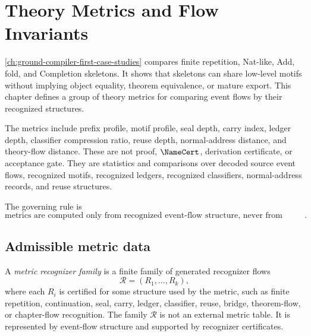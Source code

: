 \chapter{Theory Metrics and Flow Invariants}
\label{ch:ground-compiler-theory-metrics-flow-invariants}

\autoref{ch:ground-compiler-first-case-studies} compares finite repetition, Nat-like, Add, fold, and Completion skeletons. It shows that skeletons can share low-level motifs without implying object equality, theorem equivalence, or mature export. This chapter defines a group of theory metrics for comparing event flows by their recognized structures.

The metrics include prefix profile, motif profile, seal depth, carry index, ledger depth, classifier compression ratio, reuse depth, normal-address distance, and theory-flow distance. These are not proof, $\NameCert$, derivation certificate, or acceptance gate. They are statistics and comparisons over decoded source event flows, recognized motifs, recognized ledgers, recognized classifiers, normal-address records, and reuse structures.

The governing rule is
$$
  \boxed{\text{metrics are computed only from recognized event-flow structure, never from channel substrings or external labels}.}
$$

\section{Admissible metric data}
\label{sec:metrics-admissible-data}

\begin{definition}
\label{def:metrics-recognizer-family}
A \emph{metric recognizer family} is a finite family of generated recognizer flows
$$
  \mathcal R=(R_1,\ldots,R_k),
$$
where each $R_i$ is certified for some structure used by the metric, such as finite repetition, continuation, seal, carry, ledger, classifier, reuse, bridge, theorem-flow, or chapter-flow recognition. The family $\mathcal R$ is not an external metric table. It is represented by event-flow structure and supported by recognizer certificates.
\end{definition}

